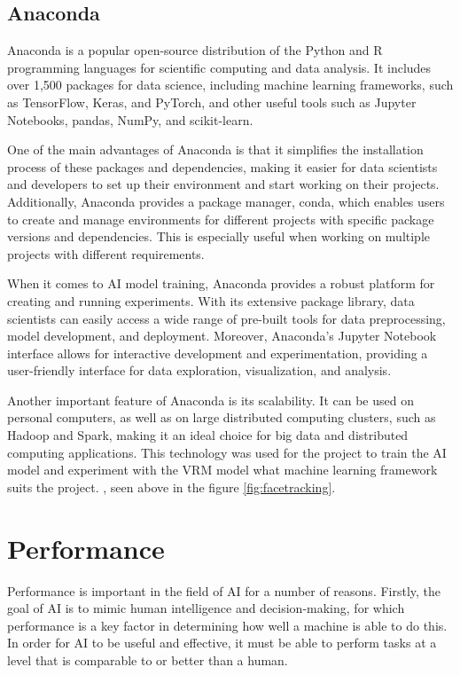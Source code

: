 \subsection{Anaconda}
Anaconda is a popular open-source distribution of the Python and R programming languages 
for scientific computing and data analysis. It includes over 1,500 packages for data science, 
including machine learning frameworks, such as TensorFlow, Keras, and PyTorch, 
and other useful tools such as Jupyter Notebooks, pandas, NumPy, and scikit-learn. \cite{anaconda}

One of the main advantages of Anaconda is that it simplifies the installation process of 
these packages and dependencies, making it easier for data scientists and developers to 
set up their environment and start working on their projects. Additionally, Anaconda 
provides a package manager, conda, which enables users to create and manage environments 
for different projects with specific package versions and dependencies. 
This is especially useful when working on multiple projects with different requirements.

When it comes to AI model training, Anaconda provides a robust platform for creating 
and running experiments. With its extensive package library, data scientists can 
easily access a wide range of pre-built tools for data preprocessing, model 
development, and deployment. Moreover, Anaconda's Jupyter Notebook interface 
allows for interactive development and experimentation, providing a 
user-friendly interface for data exploration, visualization, and analysis. \cite{anaconda2}

Another important feature of Anaconda is its scalability. It can be 
used on personal computers, as well as on large distributed computing clusters, 
such as Hadoop and Spark, making it an ideal choice for big data and distributed 
computing applications. This technology was used for the project to train the AI model 
and experiment with the VRM model what machine learning framework suits the project. ,
seen above in the figure \ref{fig:facetracking}.

\section{Performance}
Performance is important in the field of AI for a number of reasons. 
Firstly, the goal of AI is to mimic human intelligence and decision-making, 
for which performance is a key factor in determining how well a machine is able 
to do this. In order for AI to be useful and effective, it must be able to perform 
tasks at a level that is comparable to or better than a human. \cite{Performance}

